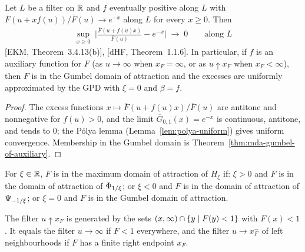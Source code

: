 \begin{theorem}
  \label{thm:pbdh-gumbel}
  \leanok
  Let $L$ be a filter on $\mathbb{R}$ and $f$ eventually positive along $L$ with
  $\overline{F}(u + x f(u))/\overline{F}(u) \to e^{-x}$ along $L$ for every $x \ge 0$. Then
  \begin{align*}
    \sup_{x \ge 0} \; \Big| \frac{\overline{F}(u + f(u) x)}{\overline{F}(u)} - e^{-x} \Big|
      \; \to \; 0 \qquad \text{along } L
  \end{align*}
  [EKM, Theorem~3.4.13(b)], [dHF, Theorem~1.1.6]. In particular, if $f$ is an auxiliary function
  for $F$ (as $u \to \infty$ when $x_F = \infty$, or as $u \uparrow x_F$ when $x_F < \infty$), then
  $F$ is in the Gumbel domain of attraction and the excesses are uniformly approximated by the
  GPD with $\xi = 0$ and $\beta = f$.
\end{theorem}
\begin{proof}
  \leanok
  The excess functions $x \mapsto \overline{F}(u + f(u)x)/\overline{F}(u)$ are antitone and
  nonnegative for $f(u) > 0$, and the limit $\overline{G}_{0,1}(x) = e^{-x}$ is continuous,
  antitone, and tends to $0$; the Pólya lemma (Lemma~\ref{lem:polya-uniform}) gives uniform
  convergence. Membership in the Gumbel domain is Theorem~\ref{thm:mda-gumbel-of-auxiliary}.
\end{proof}

\begin{definition}
  \label{def:mda-gev}
  \leanok
  For $\xi \in \mathbb{R}$, $F$ is in the maximum domain of attraction of $H_\xi$ if: $\xi > 0$ and
  $F$ is in the domain of attraction of $\Phi_{1/\xi}$; or $\xi < 0$ and $F$ is in the
  domain of attraction of $\Psi_{-1/\xi}$; or $\xi = 0$ and $F$ is in the Gumbel domain of
  attraction.
\end{definition}

\begin{definition}
  \label{def:upper-endpoint-filter}
  \leanok
  The filter $u \uparrow x_F$ is generated by the sets $(x, \infty) \cap \left\{  y \; | \; F(y) < 1  \right\}$
  with $F(x) < 1$. It equals the filter $u \to \infty$ if $F < 1$ everywhere, and the filter
  $u \to x_F^-$ of left neighbourhoods if $F$ has a finite right endpoint $x_F$.
\end{definition}

